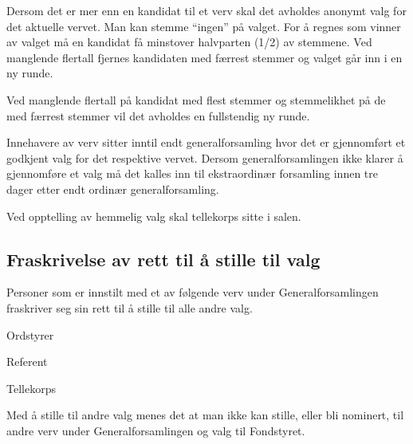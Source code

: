 Dersom det er mer enn en kandidat til et verv skal det avholdes anonymt valg for det aktuelle vervet. Man kan stemme “ingen” på valget. For å regnes som vinner av valget må en kandidat få minstover halvparten (1/2) av stemmene. Ved manglende flertall fjernes kandidaten med færrest stemmer og valget går inn i en ny runde.

Ved manglende flertall på kandidat med flest stemmer og stemmelikhet på de med færrest stemmer vil det avholdes en fullstendig ny runde.

Innehavere av verv sitter inntil endt generalforsamling hvor det er gjennomført et godkjent valg for det respektive vervet. Dersom generalforsamlingen ikke klarer å gjennomføre et valg må det kalles inn til ekstraordinær forsamling innen tre dager etter endt ordinær generalforsamling.

Ved opptelling av hemmelig valg skal tellekorps sitte i salen.

\subsection{Fraskrivelse av rett til å stille til valg}


Personer som er innstilt med et av følgende verv under Generalforsamlingen fraskriver seg sin rett til å stille til alle andre valg.
\begin{liste}
  \item Ordstyrer
  \item Referent
  \item Tellekorps
\end{liste}

Med å stille til andre valg menes det at man ikke kan stille, eller bli nominert, til andre verv under Generalforsamlingen og valg til Fondstyret.
